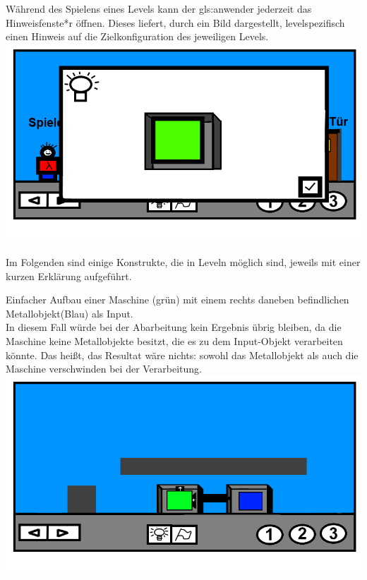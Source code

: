 \documentclass{scrartcl}
\begin{document}
\begin{description}
\begin{enumerate}
		\begin{minipage}{1\textwidth}
			\item \label{Levelaufbau:Levelhinweis} Während des Spielens eines Levels kann der \gls{gls:anwender} jederzeit das Hinweisfenste*r öffnen. Dieses liefert, durch ein Bild dargestellt, levelspezifisch einen Hinweis auf die Zielkonfiguration des jeweiligen Levels.\\
			\includegraphics[scale=0.5]{assets/Levelhinweis}
		\end{minipage}
	\end{enumerate}
	
\clearpage

	\item[Konstrukte:] \label{Levelaufbau:Konstrukte} Im Folgenden sind einige Konstrukte, die in Leveln möglich sind, jeweils mit einer kurzen Erklärung aufgeführt.\\
	
		\begin{minipage}{1\textwidth}
			Einfacher Aufbau einer Maschine (grün) mit einem rechts daneben befindlichen Metallobjekt(Blau) als Input.\\
			In diesem Fall würde bei der Abarbeitung kein Ergebnis übrig bleiben, da die Maschine keine Metallobjekte besitzt, die es zu dem Input-Objekt verarbeiten könnte. Das heißt, das Resultat wäre nichts: sowohl das Metallobjekt als auch die Maschine verschwinden bei der Verarbeitung.\\
			\includegraphics[scale=0.5]{assets/LevelBsp1}
		\end{minipage}
		

\end{description}
\end{document}
